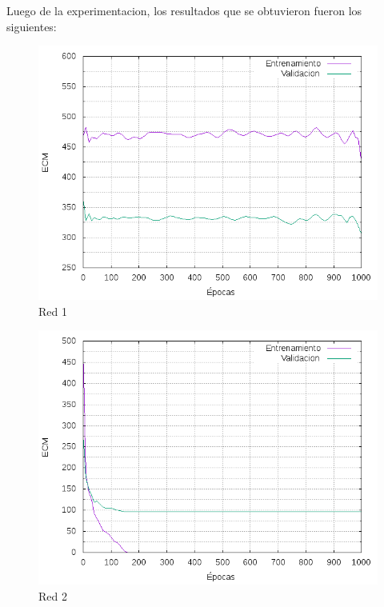 Luego de la experimentacion, los resultados que se obtuvieron fueron los siguientes:
\begin{figure}[H]
  \includegraphics[width=125mm]{imagenes/ej1/ex_1-1_red_11-1_errors.png}
  \caption{Red 1}
\end{figure}

\begin{figure}[H]
  \includegraphics[width=125mm]{imagenes/ej1/ex_1-1_red_11-21-1_errors.png}
  \caption{Red 2}
\end{figure}

